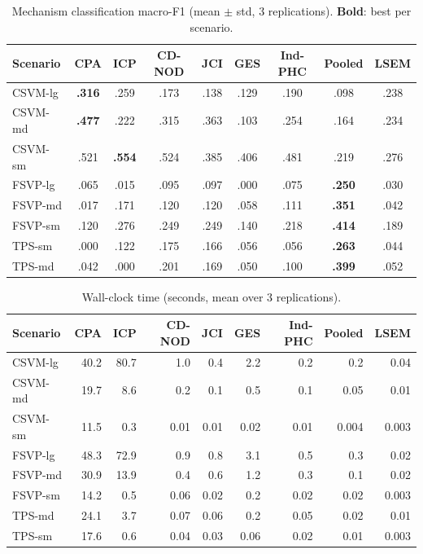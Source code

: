 \documentclass[11pt]{article}
\newcommand{\cpa}{\textsc{CPA}}
\begin{document}
\begin{table}[t]
\centering
\caption{Mechanism classification macro-F1 (mean $\pm$ std, 3 replications).
\textbf{Bold}: best per scenario.}
\label{tab:classification}
\small
\begin{tabular}{lcccccccc}
\toprule
Scenario & \cpa{} & ICP & CD-NOD & JCI & GES & Ind-PHC & Pooled & LSEM \\
\midrule
CSVM-lg & \textbf{.316} & .259 & .173 & .138 & .129 & .190 & .098 & .238 \\
CSVM-md & \textbf{.477} & .222 & .315 & .363 & .103 & .254 & .164 & .234 \\
CSVM-sm & .521 & \textbf{.554} & .524 & .385 & .406 & .481 & .219 & .276 \\
FSVP-lg & .065 & .015 & .095 & .097 & .000 & .075 & \textbf{.250} & .030 \\
FSVP-md & .017 & .171 & .120 & .120 & .058 & .111 & \textbf{.351} & .042 \\
FSVP-sm & .120 & .276 & .249 & .249 & .140 & .218 & \textbf{.414} & .189 \\
TPS-sm & .000 & .122 & .175 & .166 & .056 & .056 & \textbf{.263} & .044 \\
TPS-md & .042 & .000 & .201 & .169 & .050 & .100 & \textbf{.399} & .052 \\
\bottomrule
\end{tabular}
\end{table}

\begin{table}[t]
\centering
\caption{Wall-clock time (seconds, mean over 3 replications).}
\label{tab:timing}
\small
\begin{tabular}{lrrrrrrrr}
\toprule
Scenario & \cpa{} & ICP & CD-NOD & JCI & GES & Ind-PHC & Pooled & LSEM \\
\midrule
CSVM-lg &  40.2 &  80.7 &  1.0 & 0.4 & 2.2 & 0.2 & 0.2 & 0.04 \\
CSVM-md &  19.7 &   8.6 &  0.2 & 0.1 & 0.5 & 0.1 & 0.05 & 0.01 \\
CSVM-sm &  11.5 &   0.3 & 0.01 & 0.01 & 0.02 & 0.01 & 0.004 & 0.003 \\
FSVP-lg &  48.3 &  72.9 &  0.9 & 0.8 & 3.1 & 0.5 & 0.3 & 0.02 \\
FSVP-md &  30.9 &  13.9 &  0.4 & 0.6 & 1.2 & 0.3 & 0.1 & 0.02 \\
FSVP-sm &  14.2 &   0.5 & 0.06 & 0.02 & 0.2 & 0.02 & 0.02 & 0.003 \\
TPS-md  &  24.1 &   3.7 & 0.07 & 0.06 & 0.2 & 0.05 & 0.02 & 0.01 \\
TPS-sm  &  17.6 &   0.6 & 0.04 & 0.03 & 0.06 & 0.02 & 0.01 & 0.003 \\
\bottomrule
\end{tabular}
\end{table}
\end{document}
